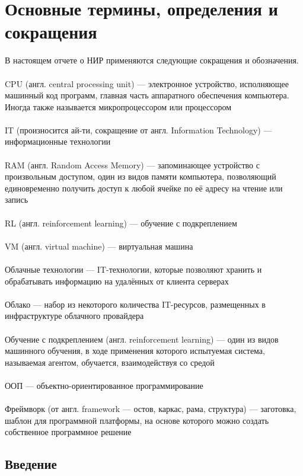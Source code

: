 \documentclass[draft]{article}
\begin{document}
\section {Основные термины, определения и сокращения}
В настоящем отчете о НИР применяются следующие сокращения и обозначения.\\
~\\
CPU (англ. central processing unit) — электронное устройство, исполняющее машинный код программ, главная часть аппаратного обеспечения компьютера. Иногда также называется микропроцессором или процессором\\
~\\
IT (произносится ай-ти, сокращение от англ. Information Technology) — информационные технологии\\
~\\
RAM (англ. Random Access Memory) — запоминающее устройство с произвольным доступом, один из видов памяти компьютера, позволяющий единовременно получить доступ к любой ячейке по её адресу на чтение или запись\\
~\\
RL (англ. reinforcement learning) — обучение с подкреплением\\
~\\
VM (англ. virtual machine) — виртуальная машина\\
~\\
Облачные технологии — IT-технологии, которые позволяют хранить и обрабатывать информацию на удалённых от клиента серверах\\
~\\
Облако — набор из некоторого количества IT-ресурсов, размещенных в инфраструктуре облачного провайдера\\
~\\
Обучение с подкреплением (англ. reinforcement learning) — один из видов машинного обучения, в ходе применения которого испытуемая система, называемая агентом, обучается, взаимодействуя со средой\\
~\\
ООП — объектно-ориентированное программирование\\
~\\
Фреймворк (от англ. framework — остов, каркас, рама, структура) — заготовка, шаблон для программной платформы, на основе которого можно создать собственное программное решение\\
\newpage
\begin{center}
\item\section {Введение}
\end{center}
\end{document}
